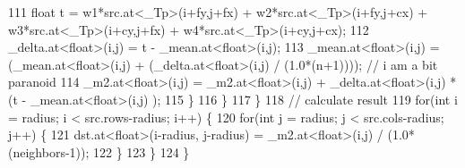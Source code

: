 \begin{DoxyCode}
111                 \textcolor{keywordtype}{float} t = w1*src.at<\_Tp>(i+fy,j+fx) + w2*src.at<\_Tp>(i+fy,j+cx) + w3*src.at<\_Tp>(i+cy,j+fx)
       + w4*src.at<\_Tp>(i+cy,j+cx);
112                 \_delta.at<\textcolor{keywordtype}{float}>(i,j) = t - \_mean.at<\textcolor{keywordtype}{float}>(i,j);
113                 \_mean.at<\textcolor{keywordtype}{float}>(i,j) = (\_mean.at<\textcolor{keywordtype}{float}>(i,j) + (\_delta.at<\textcolor{keywordtype}{float}>(i,j) / (1.0*(n+1)))); \textcolor{comment}{// i
       am a bit paranoid}
114                 \_m2.at<\textcolor{keywordtype}{float}>(i,j) = \_m2.at<\textcolor{keywordtype}{float}>(i,j) + \_delta.at<\textcolor{keywordtype}{float}>(i,j) * (t - \_mean.at<\textcolor{keywordtype}{float}>(i,j)
      );
115             \}
116         \}
117     \}
118     \textcolor{comment}{// calculate result}
119     \textcolor{keywordflow}{for}(\textcolor{keywordtype}{int} i = radius; i < src.rows-radius; i++) \{
120         \textcolor{keywordflow}{for}(\textcolor{keywordtype}{int} j = radius; j < src.cols-radius; j++) \{
121             dst.at<\textcolor{keywordtype}{float}>(i-radius, j-radius) = \_m2.at<\textcolor{keywordtype}{float}>(i,j) / (1.0*(neighbors-1));
122         \}
123     \}
124 \}
\end{DoxyCode}
